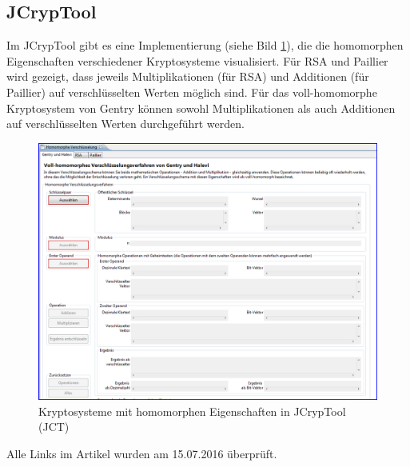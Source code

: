 \begin{refsegment}
\newpage

\subsection{JCrypTool}

Im JCrypTool gibt es eine Implementierung (siehe Bild \ref{JCT-HomEnc}), die die homomorphen Eigenschaften verschiedener Kryptosysteme visualisiert. Für RSA und Paillier wird gezeigt, dass jeweils Multiplikationen (für RSA) und Additionen (für Paillier) auf verschlüsselten Werten möglich sind. Für das voll-homomorphe Kryptosystem von Gentry können sowohl Multiplikationen als auch Additionen auf verschlüsselten Werten durchgeführt werden.

\begin{figure}[ht]
\begin{center}
\includegraphics[scale=0.4]{figures/JCT-HomEnc.PNG}
\caption{Kryptosysteme mit homomorphen Eigenschaften in JCrypTool (JCT)}
\label{JCT-HomEnc}
\end{center}
\end{figure}



\printbibliography[%
	heading=subbibintoc,
	title={Literatur zu Kapitel \thechapter},
	segment=\therefsegment,
]


Alle Links im Artikel wurden am 15.07.2016 überprüft.


\end{refsegment}


